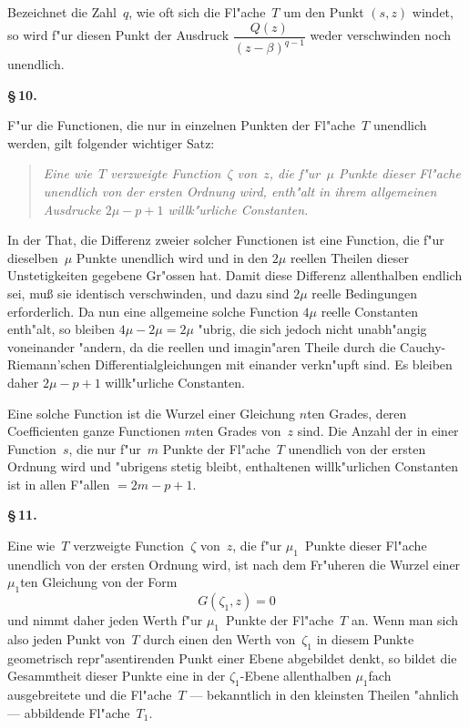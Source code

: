 \documentclass[12pt,a4paper]{book}
\theoremstyle{definition}
\theoremstyle{remark}
\begin{document}
Bezeichnet die Zahl~$q$, wie oft sich die Fl"ache~$T$ um den Punkt
$(s,z)$ windet, so wird f"ur diesen Punkt der Ausdruck
$\dfrac{Q(z)}{(z-\beta)^{q-1}}$ weder verschwinden noch unendlich.

\medskip
\textbf{\S\,10.}

F"ur die Functionen, die nur in einzelnen Punkten der Fl"ache~$T$
unendlich werden, gilt folgender wichtiger Satz:

\begin{quote}
\textit{Eine wie~$T$ verzweigte Function~$\zeta$ von~$z$, die f"ur~$\mu$ Punkte
dieser Fl"ache unendlich von der ersten Ordnung wird, enth"alt in ihrem
allgemeinen Ausdrucke $2\mu - p + 1$ willk"urliche Constanten.}
\end{quote}

In der That, die Differenz zweier solcher Functionen ist eine Function,
die f"ur dieselben~$\mu$ Punkte unendlich wird und in den $2\mu$ reellen
Theilen dieser Unstetigkeiten gegebene Gr"ossen hat. Damit diese Differenz
allenthalben endlich sei, mu\ss{} sie identisch verschwinden, und dazu sind
$2\mu$ reelle Bedingungen erforderlich. Da nun eine allgemeine solche
Function $4\mu$ reelle Constanten enth"alt, so bleiben $4\mu - 2\mu = 2\mu$
"ubrig, die sich jedoch nicht unabh"angig voneinander "andern, da die
reellen und imagin"aren Theile durch die Cauchy-Riemann'schen
Differentialgleichungen mit einander verkn"upft sind. Es bleiben daher
$2\mu - p + 1$ willk"urliche Constanten.

Eine solche Function ist die Wurzel einer Gleichung $n$ten Grades,
deren Coefficienten ganze Functionen $m$ten Grades von~$z$ sind. Die
Anzahl der in einer Function~$s$, die nur f"ur~$m$ Punkte der Fl"ache~$T$
unendlich von der ersten Ordnung wird und "ubrigens stetig bleibt,
enthaltenen willk"urlichen Constanten ist in allen F"allen $= 2m - p + 1$.

\medskip
\textbf{\S\,11.}

Eine wie~$T$ verzweigte Function~$\zeta$ von~$z$, die f"ur $\mu_1$~Punkte
dieser Fl"ache unendlich von der ersten Ordnung wird, ist nach dem
Fr"uheren die Wurzel einer $\mu_1$ten Gleichung von der Form
\[
G(\zeta_1, z) = 0
\]
und nimmt daher jeden Werth f"ur $\mu_1$~Punkte der Fl"ache~$T$ an. Wenn
man sich also jeden Punkt von~$T$ durch einen den Werth von~$\zeta_1$ in
diesem Punkte geometrisch repr"asentirenden Punkt einer Ebene abgebildet
denkt, so bildet die Gesammtheit dieser Punkte eine in der
$\zeta_1$-Ebene allenthalben $\mu_1$fach ausgebreitete und die Fl"ache~$T$
--- bekanntlich in den kleinsten Theilen "ahnlich --- abbildende Fl"ache~$T_1$.
\end{document}
